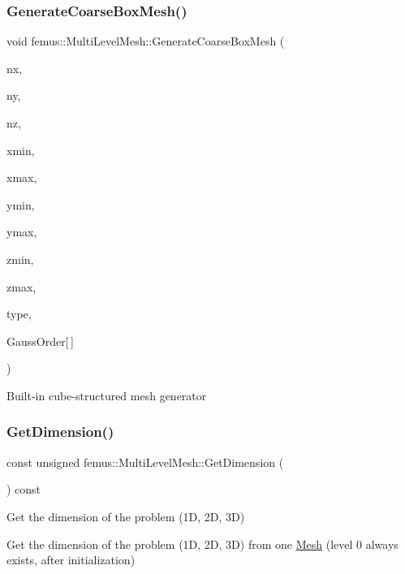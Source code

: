 \subsubsection{\texorpdfstring{Generate\+Coarse\+Box\+Mesh()}{GenerateCoarseBoxMesh()}}
{\footnotesize\ttfamily void femus\+::\+Multi\+Level\+Mesh\+::\+Generate\+Coarse\+Box\+Mesh (\begin{DoxyParamCaption}\item[{const unsigned int}]{nx,  }\item[{const unsigned int}]{ny,  }\item[{const unsigned int}]{nz,  }\item[{const double}]{xmin,  }\item[{const double}]{xmax,  }\item[{const double}]{ymin,  }\item[{const double}]{ymax,  }\item[{const double}]{zmin,  }\item[{const double}]{zmax,  }\item[{const \mbox{\hyperlink{_elem_type_enum_8hpp_a1b014294b9757a001707c979e2bab627}{Elem\+Type}}}]{type,  }\item[{const char}]{Gauss\+Order\mbox{[}$\,$\mbox{]} }\end{DoxyParamCaption})}

Built-\/in cube-\/structured mesh generator \mbox{\label{classfemus_1_1_multi_level_mesh_a65dabdf1e308c1a44ebe5c6a41d09284}} 
\subsubsection{\texorpdfstring{Get\+Dimension()}{GetDimension()}}
{\footnotesize\ttfamily const unsigned femus\+::\+Multi\+Level\+Mesh\+::\+Get\+Dimension (\begin{DoxyParamCaption}{ }\end{DoxyParamCaption}) const}

Get the dimension of the problem (1D, 2D, 3D)

Get the dimension of the problem (1D, 2D, 3D) from one \mbox{\hyperlink{classfemus_1_1_mesh}{Mesh}} (level 0 always exists, after initialization) \mbox{\label{classfemus_1_1_multi_level_mesh_a12fb14206d4b1329cd18b828d6a20b17}} 
